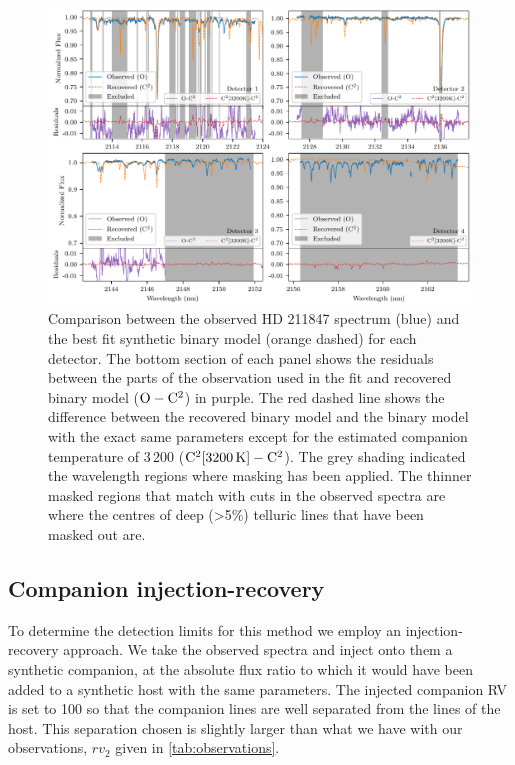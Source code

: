 \begin{figure}
    \centering

   \includegraphics[width=0.7\linewidth]{figures/companion_recovery/visualize_result_residuals}
    \caption{Comparison between the observed {HD 211847} spectrum (blue) and the best fit synthetic binary model (orange dashed) for each detector.
The bottom section of each panel shows the residuals between the parts of the observation used in the \textchisquared{} fit and recovered binary model (\(\rm O-C^2\)) in purple.
The red dashed line shows the difference between the recovered binary model and the binary model with the exact same parameters except for the estimated companion temperature of 3\,200\K{} (\(\rm C^2[3200\,\si{\kelvin}{}]- C^2\)).
The grey shading indicated the wavelength regions where masking has been applied.
The thinner masked regions that match with cuts in the observed spectra are where the centres of deep (>5\%) telluric lines that have been masked out are.}
    \label{fig:visualinspection-hd2118471}
\end{figure}


\subsection{Companion injection-recovery}
\label{subsec:injection-recovery}
To determine the detection limits for this method we employ an injection-recovery approach.
We take the observed spectra and inject onto them a synthetic companion, at the absolute flux ratio to which it would have been added to a synthetic host with the same parameters.
The injected companion {RV} is set to 100\kmps{} so that the companion lines are well separated from the lines of the host.
This separation chosen is slightly larger than what we have with our observations, \(rv_2\) given in \cref{tab:observations}.

